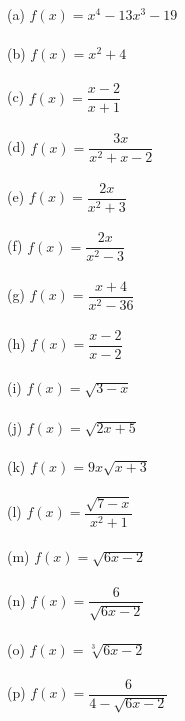 \begin{enumialphparenastyle}
\begin{multicols}{2}
\begin{ex}
(a) \hspace{2mm}  $f(x) = x^{4} - 13x^{3}  - 19$ \\
\\
(b) \hspace{2mm}  $f(x) = x^2 + 4$\\
	\\	
(c) \hspace{2mm}	$f(x) = \dfrac{x-2}{x+1}$\\
\\
(d) \hspace{2mm} $f(x) = \dfrac{3x}{x^2+x-2}$\\
\\
(e) \hspace{2mm}  $f(x) = \dfrac{2x}{x^2+3}$\\
\\
(f) \hspace{2mm} $f(x) = \dfrac{2x}{x^2-3}$\\
\\
(g) \hspace{2mm}  $f(x) = \dfrac{x+4}{x^2 - 36}$\\
\\
(h) \hspace{2mm} $f(x) = \dfrac{x-2}{x-2}$  \\
\\
(i) \hspace{2mm}  $f(x) = \sqrt{3-x}$\\
\\
(j) \hspace{2mm} $f(x) = \sqrt{2x+5}$  \\
\\
(k) \hspace{2mm} $f(x) = 9x\sqrt{x+3}$\\
\\
(l) \hspace{2mm} $f(x) = \dfrac{\sqrt{7-x}}{x^2+1}$  \\
\\
(m) \hspace{2mm} $f(x) = \sqrt{6x-2}$\\
\\
(n) \hspace{2mm} $f(x) = \dfrac{6}{\sqrt{6x-2}}$\\
\\
(o) \hspace{2mm}  $f(x) = \sqrt[3]{6x-2}$\\
\\
(p) \hspace{2mm} $f(x) = \dfrac{6}{4 - \sqrt{6x-2}}$\\

\end{ex}
\end{multicols}
\end{enumialphparenastyle}
